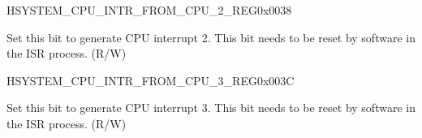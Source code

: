 \begin{register}{H}{SYSTEM\_CPU\_INTR\_FROM\_CPU\_2\_REG}{0x{}0038}\label{regdesc:SYSTEMCPUINTRFROMCPU2REG}
%
%
\regnewline%
\begin{regdesc}\begin{reglist}
\label{fielddesc:SYSTEMCPUINTRFROMCPU2}\item [SYSTEM\_CPU\_INTR\_FROM\_CPU\_2] Set this bit to generate CPU interrupt 2. This bit needs to be reset by software in the ISR process. (R/W)
\end{reglist}\end{regdesc}
\end{register}


\begin{register}{H}{SYSTEM\_CPU\_INTR\_FROM\_CPU\_3\_REG}{0x{}003C}\label{regdesc:SYSTEMCPUINTRFROMCPU3REG}
%
%
\regnewline%
\begin{regdesc}\begin{reglist}
\label{fielddesc:SYSTEMCPUINTRFROMCPU3}\item [SYSTEM\_CPU\_INTR\_FROM\_CPU\_3] Set this bit to generate CPU interrupt 3. This bit needs to be reset by software in the ISR process. (R/W)
\end{reglist}\end{regdesc}
\end{register}


